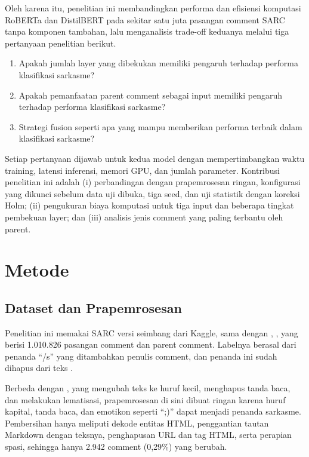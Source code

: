 \documentclass[conference]{IEEEtran}
\begin{document}
Oleh karena itu, penelitian ini membandingkan performa dan efisiensi komputasi RoBERTa dan DistilBERT pada sekitar satu juta pasangan comment SARC tanpa komponen tambahan, lalu menganalisis trade-off keduanya melalui tiga pertanyaan penelitian berikut.
\begin{enumerate}
\item Apakah jumlah layer yang dibekukan memiliki pengaruh terhadap performa klasifikasi sarkasme?
\item Apakah pemanfaatan parent comment sebagai input memiliki pengaruh terhadap performa klasifikasi sarkasme?
\item Strategi fusion seperti apa yang mampu memberikan performa terbaik dalam klasifikasi sarkasme?
\end{enumerate}
Setiap pertanyaan dijawab untuk kedua model dengan mempertimbangkan waktu training, latensi inferensi, memori GPU, dan jumlah parameter. Kontribusi penelitian ini adalah (i) perbandingan dengan prapemrosesan ringan, konfigurasi yang dikunci sebelum data uji dibuka, tiga seed, dan uji statistik dengan koreksi Holm; (ii) pengukuran biaya komputasi untuk tiga input dan beberapa tingkat pembekuan layer; dan (iii) analisis jenis comment yang paling terbantu oleh parent.

\section{Metode}

\subsection{Dataset dan Prapemrosesan}
\label{sec:data}
Penelitian ini memakai SARC \cite{khodak2018sarc} versi seimbang dari Kaggle, sama dengan \cite{dubey2026efficient}, \cite{zhang2025enhancing}, yang berisi 1.010.826 pasangan comment dan parent comment. Labelnya berasal dari penanda ``/s'' yang ditambahkan penulis comment, dan penanda ini sudah dihapus dari teks \cite{khodak2018sarc}.

Berbeda dengan \cite{dubey2026efficient}, \cite{zhang2025enhancing} yang mengubah teks ke huruf kecil, menghapus tanda baca, dan melakukan lematisasi, prapemrosesan di sini dibuat ringan karena huruf kapital, tanda baca, dan emotikon seperti ``;)'' dapat menjadi penanda sarkasme. Pembersihan hanya meliputi dekode entitas HTML, penggantian tautan Markdown dengan teksnya, penghapusan URL dan tag HTML, serta perapian spasi, sehingga hanya 2.942 comment (0,29\%) yang berubah.
\end{document}
